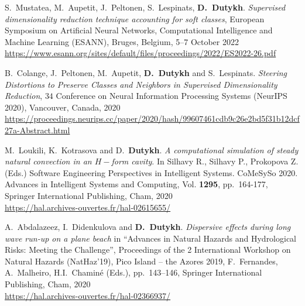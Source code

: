 \documentclass[final, a4paper, oneside, 12pt]{article}
\numberwithin{equation}{section}
\begin{document}
\begin{etaremune}



  \item S.~Mustatea, M.~Aupetit, J.~Peltonen, S.~Lespinats, \textbf{D.~Dutykh}. \textit{Supervised dimensionality reduction technique accounting for soft classes}, European Symposium on Artificial Neural Networks, Computational Intelligence and Machine Learning (ESANN), Bruges, Belgium, 5--7 October 2022 \\ %
  \url{https://www.esann.org/sites/default/files/proceedings/2022/ES2022-26.pdf}


  
  \item B.~Colange, J.~Peltonen, M.~Aupetit, \textbf{D.~Dutykh} and S.~Lespinats. \textit{Steering Distortions to Preserve Classes and Neighbors in Supervised Dimensionality Reduction}, $34$ Conference on Neural Information Processing Systems (NeurIPS 2020), Vancouver, Canada, 2020 \\ %
  {\small \url{https://proceedings.neurips.cc/paper/2020/hash/99607461cdb9c26e2bd5f31b12dcf27a-Abstract.html}}
  
  \item M.~Loukili, K.~Kotrasova and D.~\textbf{Dutykh}. \textit{A computational simulation of steady natural convection in an $H-$form cavity}. In Silhavy R., Silhavy P., Prokopova Z. (Eds.) Software Engineering Perspectives in Intelligent Systems. CoMeSySo 2020. Advances in Intelligent Systems and Computing, Vol. \textbf{1295}, pp.~164-177, Springer International Publishing, Cham, 2020 \\ %
  \url{https://hal.archives-ouvertes.fr/hal-02615655/}

  \item A.~Abdalazeez, I.~Didenkulova and \textbf{D.~Dutykh}. \textit{Dispersive effects during long wave run-up on a plane beach} in ``Advances in Natural Hazards and Hydrological Risks: Meeting the Challenge'', Proceedings of the 2 International Workshop on Natural Hazards (NatHaz'19), Pico Island -- the Azores 2019, F.~Fernandes, A.~Malheiro, H.I.~Chamin\'e (Eds.), pp.~143--146, Springer International Publishing, Cham, 2020 \\ %
  \url{https://hal.archives-ouvertes.fr/hal-02366937/}
  

\end{etaremune}
\end{document}
